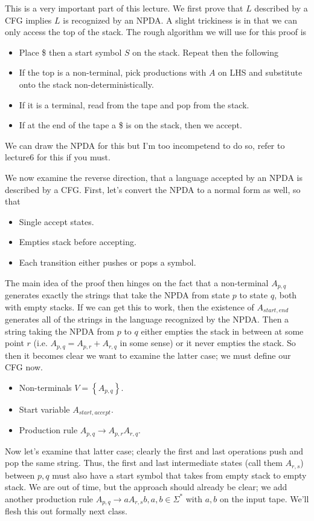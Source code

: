 \documentclass[10pt]{report}
\begin{document}
This is a very important part of this lecture. We first prove that $L$ described by a CFG implies $L$ is recognized by an NPDA. A slight trickiness is in that we can only access the top of the stack. The rough algorithm we will use for this proof is
\begin{itemize}
    \item Place \$ then a start symbol $S$ on the stack. Repeat then the following
    \item If the top is a non-terminal, pick productions with $A$ on LHS and substitute onto the stack non-deterministically.
    \item If it is a terminal, read from the tape and pop from the stack.
    \item If at the end of the tape a \$ is on the stack, then we accept.
\end{itemize}

We can draw the NPDA for this but I'm too incompetend to do so, refer to lecture6 for this if you must. 

We now examine the reverse direction, that a language accepted by an NPDA is described by a CFG. First, let's convert the NPDA to a normal form as well, so that
\begin{itemize}
    \item Single accept states.
    \item Empties stack before accepting.
    \item Each transition either pushes or pops a symbol.
\end{itemize}

The main idea of the proof then hinges on the fact that a non-terminal $A_{p,q}$ generates exactly the strings that take the NPDA from state $p$ to state $q$, both with empty stacks. If we can get this to work, then the existence of $A_{start, end}$ generates all of the strings in the language recognized by the NPDA. Then a string taking the NPDA from $p$ to $q$ either empties the stack in between at some point $r$ (i.e. $A_{p,q} = A_{p,r} + A_{r,q}$ in some sense) or it never empties the stack. So then it becomes clear we want to examine the latter case; we must define our CFG now.
\begin{itemize}
    \item Non-terminals $V = \left\{ A_{p,q} \right\}$.
    \item Start variable $A_{start, accept}$.
    \item Production rule $A_{p,q} \to A_{p,r}A_{r,q}$.
\end{itemize}

Now let's examine that latter case; clearly the first and last operations push and pop the same string. Thus, the first and last intermediate states (call them $A_{r,s}$) between $p,q$ must also have a start symbol that takes from empty stack to empty stack. We are out of time, but the approach should already be clear; we add another production rule $A_{p,q} \to a A_{r,s}b, a,b \in \Sigma^*$ with $a,b$ on the input tape. We'll flesh this out formally next class. 
\end{document}
